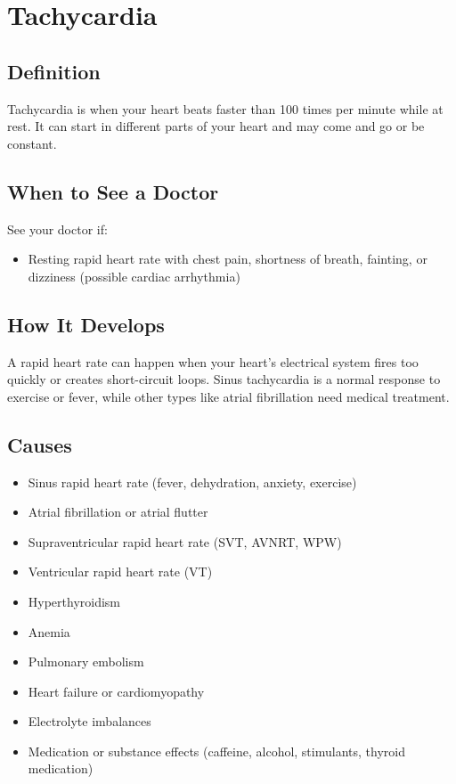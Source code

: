 \chapter{Tachycardia}

\section*{Definition}
Tachycardia is when your heart beats faster than 100 times per minute while at rest. It can start in different parts of your heart and may come and go or be constant.

\section*{When to See a Doctor}
See your doctor if:
\begin{itemize}
  \item Resting rapid heart rate with chest pain, shortness of breath, fainting, or dizziness (possible cardiac arrhythmia)
\end{itemize}

\section*{How It Develops}
A rapid heart rate can happen when your heart's electrical system fires too quickly or creates short-circuit loops. Sinus tachycardia is a normal response to exercise or fever, while other types like atrial fibrillation need medical treatment.

\section*{Causes}
\begin{itemize}
  \item Sinus rapid heart rate (fever, dehydration, anxiety, exercise)
  \item Atrial fibrillation or atrial flutter
  \item Supraventricular rapid heart rate (SVT, AVNRT, WPW)
  \item Ventricular rapid heart rate (VT)
  \item Hyperthyroidism
  \item Anemia
  \item Pulmonary embolism
  \item Heart failure or cardiomyopathy
  \item Electrolyte imbalances
  \item Medication or substance effects (caffeine, alcohol, stimulants, thyroid medication)
\end{itemize}

